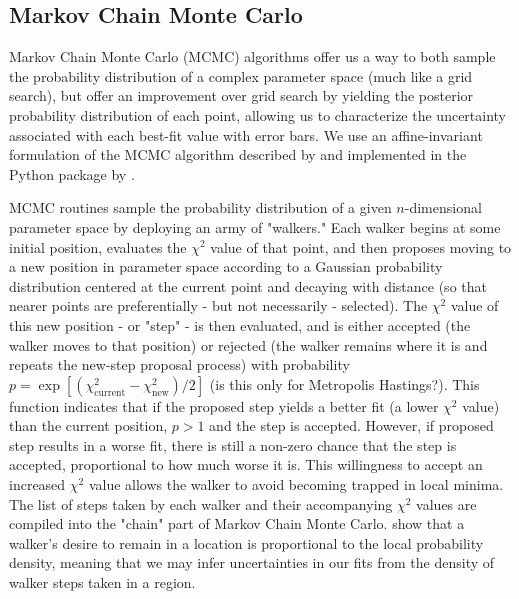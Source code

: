 \subsection{Markov Chain Monte Carlo}
\label{subsection:mcmc}

Markov Chain Monte Carlo (MCMC) algorithms offer us a way to both sample the probability distribution of a complex parameter space (much like a grid search), but offer an improvement over grid search by yielding the posterior probability distribution of each point, allowing us to characterize the uncertainty associated with each best-fit value with error bars. We use an affine-invariant formulation of the MCMC algorithm described by \cite{Goodman2010} and implemented in the Python package  by \cite{ForemanMackey2013}.

MCMC routines sample the probability distribution of a given $n$-dimensional parameter space by deploying an army of "walkers." Each walker begins at some initial position, evaluates the $\chi^2$ value of that point, and then proposes moving to a new position in parameter space according to a Gaussian probability distribution centered at the current point and decaying with distance (so that nearer points are preferentially - but not necessarily - selected). The $\chi^2$ value of this new position - or "step" - is then evaluated, and is either accepted (the walker moves to that position) or rejected (the walker remains where it is and repeats the new-step proposal process) with probability $p = \exp \left[ (\chi_\text{current}^2 - \chi_\text{new}^2)/2 \right]$ (is this only for Metropolis Hastings?). This function indicates that if the proposed step yields a better fit (a lower $\chi^2$ value) than the current position, $p > 1$ and the step is accepted. However, if proposed step results in a worse fit, there is still a non-zero chance that the step is accepted, proportional to how much worse it is. This willingness to accept an increased $\chi^2$ value allows the walker to avoid becoming trapped in local minima. The list of steps taken by each walker and their accompanying $\chi^2$ values are compiled into the "chain" part of Markov Chain Monte Carlo. \cite{Goodman2010} show that a walker's desire to remain in a location is proportional to the local probability density, meaning that we may infer uncertainties in our fits from the density of walker steps taken in a region.

